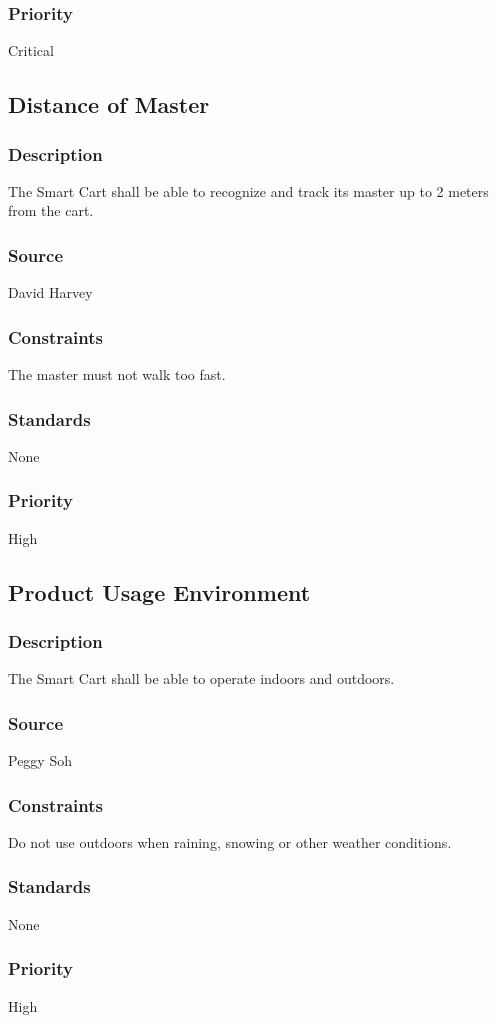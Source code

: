 \subsubsection{Priority}
Critical


\subsection{Distance of Master}
\subsubsection{Description}
The Smart Cart shall be able to recognize and track its master up to 2 meters from the cart. 
\subsubsection{Source}
David Harvey
\subsubsection{Constraints}
The master must not walk too fast.
\subsubsection{Standards}
None
\subsubsection{Priority}
High


\subsection{Product Usage Environment}
\subsubsection{Description}
The Smart Cart shall be able to operate indoors and outdoors. 
\subsubsection{Source}
Peggy Soh
\subsubsection{Constraints}
Do not use outdoors when raining, snowing or other weather conditions.
\subsubsection{Standards}
None
\subsubsection{Priority}
High
